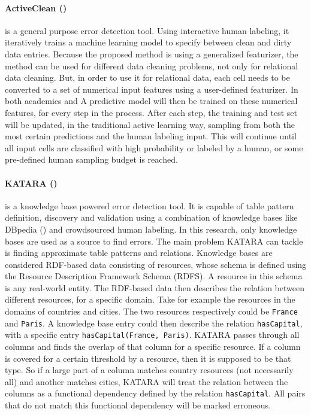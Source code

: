 
\paragraph{ActiveClean (\cite{Krishnan2016-va})} is a general purpose error detection tool. Using interactive human labeling, it iteratively trains a machine learning model to specify between clean and dirty data entries. Because the proposed method is using a generalized featurizer, the method can be used for different data cleaning problems, not only for relational data cleaning. But, in order to use it for relational data, each cell needs to be converted to a set of numerical input features using a user-defined featurizer. In both academics and  A predictive model will then be trained on these numerical features, for every step in the process. After each step, the training and test set will be updated, in the traditional active learning way, sampling from both the most certain predictions and the human labeling input. This will continue until all input cells are classified with high probability or labeled by a human, or some pre-defined human sampling budget is reached.

\paragraph{KATARA (\cite{Chu2015-fs})} is a knowledge base powered error detection tool. It is capable of table pattern definition, discovery and validation using a combination of knowledge bases like DBpedia (\cite{Auer2007-ie}) and crowdsourced human labeling. In this research, only knowledge bases are used as a source to find errors. The main problem KATARA can tackle is finding approximate table patterns and relations. Knowledge bases are considered RDF-based data consisting of resources, whose schema is defined using the Resource Description Framework Schema (RDFS). A resource in this schema is any real-world entity. The RDF-based data then describes the relation between different resources, for a specific domain. Take for example the resources in the domains of countries and cities. The two resources respectively could be \verb|France| and \verb|Paris|. A knowledge base entry could then describe the relation \verb|hasCapital|, with a specific entry \verb|hasCapital(France, Paris)|. KATARA passes through all columns and finds the overlap of that column for a specific resource. If a column is covered for a certain threshold by a resource, then it is supposed to be that type. So if a large part of a column matches country resources (not necessarily all) and another matches cities, KATARA will treat the relation between the columns as a functional dependency defined by the relation \verb|hasCapital|. All pairs that do not match this functional dependency will be marked erroneous. 

